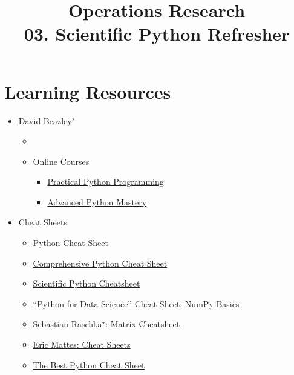 \documentclass[11pt]{extarticle}
\theoremstyle{definition}
\begin{document}
\title{\texorpdfstring{\vspace{15mm} Operations Research\\ 03. Scientific Python Refresher}{Operations Research\\ 03. Scientific Python Refresher}} 
\author{}
\date{}
\maketitle
\newpage

\section*{Learning Resources}

\begin{itemize}\setlength{\itemsep}{0pt}
  \item \href{https://www.dabeaz.com/}{David Beazley$^\star$}
    \begin{itemize}
      \item \citet{beazley_ess,cookbook,beazley_dis}
      \item Online Courses
        \begin{itemize}
          \item \href{https://github.com/dabeaz-course/practical-python}{Practical Python Programming}
          \item \href{https://github.com/dabeaz-course/python-mastery}{Advanced Python Mastery}
        \end{itemize}
    \end{itemize}
  \item Cheat Sheets
  \begin{itemize}%
      \item \href{https://www.pythoncheatsheet.org/}{Python Cheat Sheet}
      \item \href{https://github.com/gto76/python-cheatsheet}{Comprehensive Python Cheat Sheet}
      \item \href{https://ipgp.github.io/scientific_python_cheat_sheet/}{Scientific Python Cheatsheet}
      \item \href{https://s3.amazonaws.com/assets.datacamp.com/blog_assets/Numpy_Python_Cheat_Sheet.pdf}{``Python for Data Science'' Cheat Sheet: NumPy Basics}
      \item \href{https://sebastianraschka.com/blog/2014/matrix_cheatsheet_table.html}{Sebastian Raschka$^\star$: Matrix Cheatsheet}
      \item \href{https://ehmatthes.github.io/pcc_3e/cheat_sheets/}{Eric Mattes: Cheat Sheets}
      \item \href{https://github.com/kieranholland/best-python-cheat-sheet}{The Best Python Cheat Sheet}
    \end{itemize}
\end{itemize}
\end{document}
